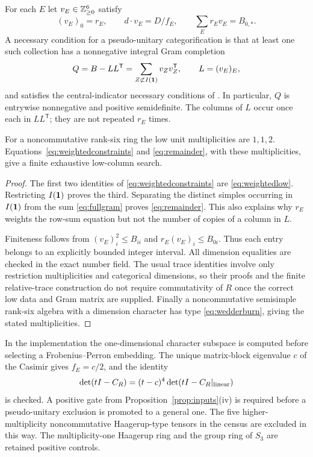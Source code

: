 \begin{theorem}\label{thm:weighted}
For each $E$ let $v_E\in\mathbb Z_{\ge0}^6$ satisfy
\begin{equation}\label{eq:weightedconstraints}
 (v_E)_0=r_E,\qquad
 d\cdot v_E=D/f_E,\qquad
 \sum_E r_Ev_E=B_{0,*}.
\end{equation}
A necessary condition for a pseudo-unitary categorification is that at
least one such collection has a nonnegative integral Gram completion
\begin{equation}\label{eq:remainder}
 Q=B-LL^{\mathsf T}=\sum_{Z\not\subset I(\mathbf1)}v_Zv_Z^{\mathsf T},
 \qquad L=(v_E)_E,
\end{equation}
and satisfies the central-indicator necessary conditions of
\cite{DP4,DP5}. In particular, $Q$ is entrywise nonnegative and positive
semidefinite. The columns of $L$ occur once each in $LL^{\mathsf T}$;
they are not repeated $r_E$ times.

For a noncommutative rank-six ring the low unit multiplicities are
$1,1,2$. Equations~\eqref{eq:weightedconstraints} and
\eqref{eq:remainder}, with these multiplicities, give a finite exhaustive
low-column search.
\end{theorem}
\begin{proof}
The first two identities of \eqref{eq:weightedconstraints} are
\eqref{eq:weightedlow}. Restricting $I(\mathbf1)$ proves the third.
Separating the distinct simples occurring in $I(\mathbf1)$ from the sum
\eqref{eq:fullgram} proves \eqref{eq:remainder}. This also explains why
$r_E$ weights the row-sum equation but not the number of copies of a
column in $L$.

Finiteness follows from
$(v_E)_i^2\le B_{ii}$ and
$r_E(v_E)_i\le B_{0i}$. Thus each entry belongs to an explicitly bounded
integer interval. All dimension equalities are checked in the exact
number field. The usual trace identities involve only restriction
multiplicities and categorical dimensions, so their proofs and the
finite relative-trace construction do not require commutativity of $R$
once the correct low data and Gram matrix are supplied. Finally a
noncommutative semisimple rank-six algebra with a dimension character
has type \eqref{eq:wedderburn}, giving the stated multiplicities.
\end{proof}

In the implementation the one-dimensional character subspace is
computed before selecting a Frobenius--Perron embedding. The unique
matrix-block eigenvalue $c$ of the Casimir gives $f_E=c/2$, and the
identity
\[
 \det(tI-C_R)=(t-c)^4\det(tI-C_R|_{\rm linear})
\]
is checked. A positive gate from Proposition~\ref{prop:inputs}(iv) is
required before a pseudo-unitary exclusion is promoted to a general
one. The five higher-multiplicity noncommutative Haagerup-type tensors
in the census are excluded in this way. The multiplicity-one Haagerup
ring and the group ring of $S_3$ are retained positive controls.

